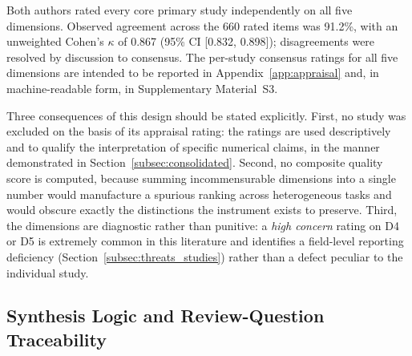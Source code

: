 \documentclass[10pt,a4paper]{article}
\newif\ifprovisionalnumbers
\newcommand{\pnum}[1]{\ifprovisionalnumbers\textcolor{orange!75!black}{\textbf{#1}}\else #1\fi}
\begin{document}
Both authors rated every core primary study independently on all five dimensions. Observed agreement across the \pnum{660} rated items was \pnum{91.2\%}, with an unweighted Cohen's $\kappa$ of \pnum{0.867} (95\% CI \pnum{[0.832, 0.898]}); disagreements were resolved by discussion to consensus. The per-study consensus ratings for all five dimensions are intended to be reported in Appendix~\ref{app:appraisal} and, in machine-readable form, in Supplementary Material~S3. \ifprovisionalnumbers\textbf{These appraisal-agreement values are provisional until checked against the original independent D1--D5 rating files.}\fi

Three consequences of this design should be stated explicitly. First, no study was excluded on the basis of its appraisal rating: the ratings are used descriptively and to qualify the interpretation of specific numerical claims, in the manner demonstrated in Section~\ref{subsec:consolidated}. Second, no composite quality score is computed, because summing incommensurable dimensions into a single number would manufacture a spurious ranking across heterogeneous tasks and would obscure exactly the distinctions the instrument exists to preserve. Third, the dimensions are diagnostic rather than punitive: a \emph{high concern} rating on D4 or D5 is extremely common in this literature and identifies a field-level reporting deficiency (Section~\ref{subsec:threats_studies}) rather than a defect peculiar to the individual study.

\subsection{Synthesis Logic and Review-Question Traceability}
\label{subsec:synthesis_logic}
\end{document}
